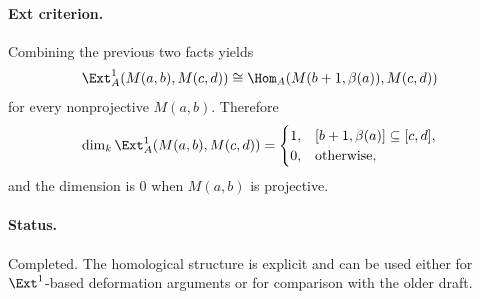 \paragraph{Ext criterion.}
Combining the previous two facts yields
\[
\Ext_A^1(M(a,b),M(c,d))
\cong
\Hom_A(M(b+1,\beta(a)),M(c,d))
\]
for every nonprojective \(M(a,b)\). Therefore
\[
\dim_k \Ext_A^1(M(a,b),M(c,d))
=
\begin{cases}
1, & [b+1,\beta(a)]\subseteq [c,d],\\
0, & \text{otherwise},
\end{cases}
\]
and the dimension is \(0\) when \(M(a,b)\) is projective.

\paragraph{Status.}
Completed. The homological structure is explicit and can be used either for
\(\Ext^1\)-based deformation arguments or for comparison with the older draft.
